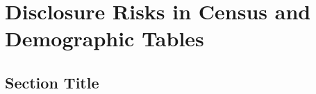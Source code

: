 \chapter{Disclosure Risks in Census and Demographic Tables}\label{ch:discrisk}


\section{Section Title} 

